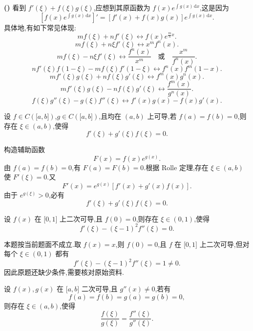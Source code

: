 \noindent\textbf{(\markstar)} 看到 $f'(\xi)+f(\xi)g(\xi)$,应想到其原函数为
$\displaystyle f(x)e^{\int g(x)\,\mathrm{d}x}$,这是因为
\[
    \left[f(x)e^{\int g(x)\,\mathrm{d}x}\right]'
    =[f'(x)+f(x)g(x)]e^{\int g(x)\,\mathrm{d}x}.
\]
具体地,有如下常见体现:
\[
    mf(\xi)+nf'(\xi)
    \longleftrightarrow
    f(x)e^{\frac{m}{n}x}.
\]
\[
    mf(\xi)+n\xi f'(\xi)
    \longleftrightarrow
    x^m f^n(x).
\]
\[
    mf(\xi)-n\xi f'(\xi)
    \longleftrightarrow
    \dfrac{f^n(x)}{x^m}
    \quad\text{或}\quad
    \dfrac{x^m}{f^n(x)}.
\]
\[
    nf'(\xi)f(1-\xi)-mf(\xi)f'(1-\xi)
    \longleftrightarrow
    f^n(x)f^m(1-x).
\]
\[
    mf'(\xi)g(\xi)+nf(\xi)g'(\xi)
    \longleftrightarrow
    f^m(x)g^n(x).
\]
\[
    mf'(\xi)g(\xi)-nf(\xi)g'(\xi)
    \longleftrightarrow
    \dfrac{f^m(x)}{g^n(x)}.
\]
\[
    f(\xi)g''(\xi)-g(\xi)f''(\xi)
    \longleftrightarrow
    f'(x)g(x)-f(x)g'(x).
\]

\begin{example}
    设 $f\in C(\lbrack a,b\rbrack)$,$g\in C(\lbrack a,b\rbrack)$,且均在 $(a,b)$ 上可导,若 $f(a)=f(b)=0$,则存在 $\xi\in(a,b)$,使得
    \[
        f'(\xi)+g'(\xi)f(\xi)=0.
    \]
\end{example}
\exampleblank

\begin{solution}
    构造辅助函数
    \[
        F(x)=f(x)e^{g(x)}.
    \]
    由 $f(a)=f(b)=0$,有 $F(a)=F(b)=0$.根据 Rolle 定理,存在 $\xi\in(a,b)$ 使 $F'(\xi)=0$.又
    \[
        F'(x)=e^{g(x)}\left[f'(x)+g'(x)f(x)\right].
    \]
    由于 $e^{g(\xi)}>0$,必有
    \[
        f'(\xi)+g'(\xi)f(\xi)=0.
    \]
\end{solution}

\begin{example}
    设 $f(x)$ 在 $\lbrack 0,1\rbrack$ 上二次可导,且 $f(0)=0$,则存在 $\xi\in(0,1)$,使得
    \[
        f'(\xi)-(\xi-1)^2f''(\xi)=0.
    \]
\end{example}
\exampleblank

\begin{solution}
    本题按当前题面不成立.取 $f(x)=x$,则 $f(0)=0$,且 $f$ 在 $\lbrack0,1\rbrack$ 上二次可导,但对每个 $\xi\in(0,1)$ 都有
    \[
        f'(\xi)-(\xi-1)^2f''(\xi)=1\neq0.
    \]
    因此原题还缺少条件,需要核对原始资料.
\end{solution}

\begin{example}
    设 $f(x),g(x)$ 在 $\lbrack a,b\rbrack$ 二次可导,且 $g''(x)\neq0$,若有
    \[
        f(a)=f(b)=g(a)=g(b)=0,
    \]
    则存在 $\xi\in(a,b)$,使得
    \[
        \dfrac{f(\xi)}{g(\xi)}=\dfrac{f''(\xi)}{g''(\xi)}.
    \]
\end{example}
\exampleblank

